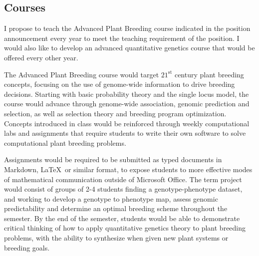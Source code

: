 \documentclass[11pt]{article}
\begin{document}


\subsection*{Courses}


I propose to teach the Advanced Plant Breeding course indicated in the position announcement every year to meet the teaching requirement of the position. I would also like to develop an advanced quantitative genetics course that would be offered every other year. 

The Advanced Plant Breeding course would target $21^\text{st}$ century plant breeding concepts, focusing on the use of genome-wide information to drive breeding decisions. Starting with basic probability theory and the single locus model, the course would advance through genome-wide association, genomic prediction and selection, as well as selection theory and breeding program optimization. Concepts introduced in class would be reinforced through weekly computational labs and assignments that require students to write their own software to solve computational plant breeding problems. 




Assignments would be required to be submitted as typed documents in Markdown, \LaTeX\ or similar format, to expose students to more effective modes of mathematical communication outside of Microsoft Office. The term project would consist of groups of 2-4 students finding a genotype-phenotype dataset, and working to develop a genotype to phenotype map, assess genomic predictability and determine an optimal breeding scheme throughout the semester. By the end of the semester, students would be able to demonstrate critical thinking of how to apply quantitative genetics theory to plant breeding problems, with the ability to synthesize when given new plant systems or breeding goals. 
\end{document}
